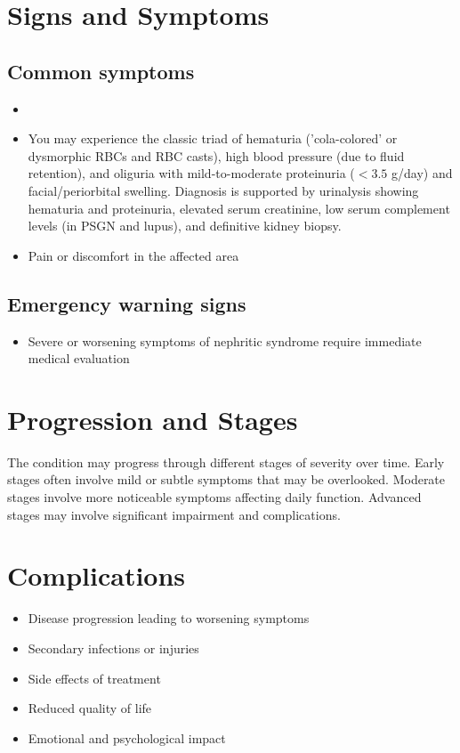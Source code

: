 \section{Signs and Symptoms}

\subsection{Common symptoms}
\begin{itemize}[noitemsep]
  \item \item You may experience the classic triad of hematuria ('cola-colored' or dysmorphic RBCs and RBC casts), high blood pressure (due to fluid retention), and oliguria with mild-to-moderate proteinuria ($<3.5$ g/day) and facial/periorbital swelling. Diagnosis is supported by urinalysis showing hematuria and proteinuria, elevated serum creatinine, low serum complement levels (in PSGN and lupus), and definitive kidney biopsy.

  \item Pain or discomfort in the affected area
  \end{itemize}

\subsection{Emergency warning signs}
\begin{itemize}[noitemsep]
  \item Severe or worsening symptoms of nephritic syndrome require immediate medical evaluation
\end{itemize}
\section{Progression and Stages}
The condition may progress through different stages of severity over time. Early stages often involve mild or subtle symptoms that may be overlooked. Moderate stages involve more noticeable symptoms affecting daily function. Advanced stages may involve significant impairment and complications.
\section{Complications}
\begin{itemize}[noitemsep]
  \item Disease progression leading to worsening symptoms
  \item Secondary infections or injuries
  \item Side effects of treatment
  \item Reduced quality of life
  \item Emotional and psychological impact
\end{itemize}
